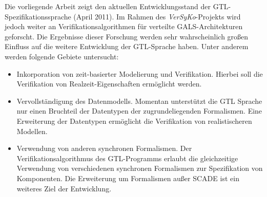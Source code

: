 Die vorliegende Arbeit zeigt den aktuellen Entwicklungsstand der GTL-Spezifikationssprache (April 2011).
Im Rahmen des \emph{VerSyKo}-Projekts wird jedoch weiter an Verifikationsalgorithmen für verteilte GALS-Architekturen geforscht.
Die Ergebnisse dieser Forschung werden sehr wahrscheinlich großen Einfluss auf die weitere Entwicklung der GTL-Sprache haben.
Unter anderem werden folgende Gebiete untersucht:
\begin{itemize}
\item Inkorporation von zeit-basierter Modelierung und Verifikation.
  Hierbei soll die Verifikation von Realzeit-Eigenschaften ermöglicht werden.
\item Vervollständigung des Datenmodells.
  Momentan unterstützt die GTL Sprache nur einen Bruchteil der Datentypen der zugrundeliegenden Formalismen.
  Eine Erweiterung der Datentypen ermöglicht die Verifikation von realistischeren Modellen.
\item Verwendung von anderen synchronen Formalismen.
  Der Verifikationsalgorithmus des GTL-Programms erlaubt die gleichzeitige Verwendung von verschiedenen synchronen Formalismen zur Spezifikation von Komponenten.
  Die Erweiterung um Formalismen außer SCADE ist ein weiteres Ziel der Entwicklung.
\end{itemize}
